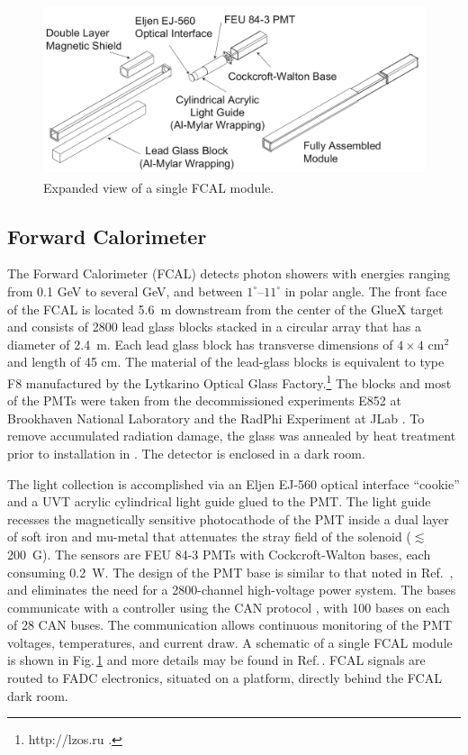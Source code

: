 \begin{figure}[tbp]\centering
\includegraphics[height=5cm]{figures/FCAL_single_module}
\caption{\label{fig:fcal:FCAL_single_module}
    Expanded view of a single FCAL module.
  }
\end{figure} 
\subsection{Forward Calorimeter \label{sec:fcal}}
The Forward Calorimeter (FCAL) detects photon showers with energies ranging from 0.1 GeV to several GeV, and  between $1^{\circ}$--$11^{\circ}$ in polar angle. 
The front face of the FCAL is located 5.6~m downstream from the center of the GlueX target and consists of 2800 lead glass blocks stacked in a circular array that has a diameter of 2.4~m. Each lead glass block has transverse dimensions of $4\times4$ cm$^2$ and length of 45 cm.
The material of the lead-glass blocks is equivalent to type F8 manufactured by the Lytkarino Optical Glass Factory.\footnote{http://lzos.ru .} The blocks and most of the PMTs were taken from the decommissioned experiments E852 at Brookhaven National Laboratory \cite{CRITTENDEN1997377} and the RadPhi Experiment at JLab \cite{JONES2007384}. To remove accumulated radiation damage, the glass was annealed by heat treatment prior to installation in \gx{}. The detector is enclosed in a dark room.

The light collection is accomplished via an Eljen EJ-560 optical interface ``cookie'' and a UVT acrylic cylindrical light guide glued to the PMT. The light guide recesses the magnetically sensitive photocathode of the PMT inside a dual layer of soft iron and mu-metal that attenuates the stray field  of the \gx{} solenoid ($\lesssim$200~G). The sensors are FEU 84-3 PMTs with Cockcroft-Walton bases, each consuming 0.2~W.  The design of the PMT base is similar to that noted in Ref.~\cite{Brunner:1998fh}, and eliminates the need for a 2800-channel high-voltage power system. The bases communicate with a controller using the CAN protocol \cite{wiki:CANBus}, with 100 bases on each of 28 CAN buses.  The communication allows continuous monitoring of the PMT voltages, temperatures, and current draw.
A schematic of a single FCAL module is shown in 
Fig.\,\ref{fig:fcal:FCAL_single_module} and more details may be found in Ref.\,\cite{MORIYA201360}. FCAL signals are routed to FADC electronics, situated on a platform, directly behind the FCAL dark room.

